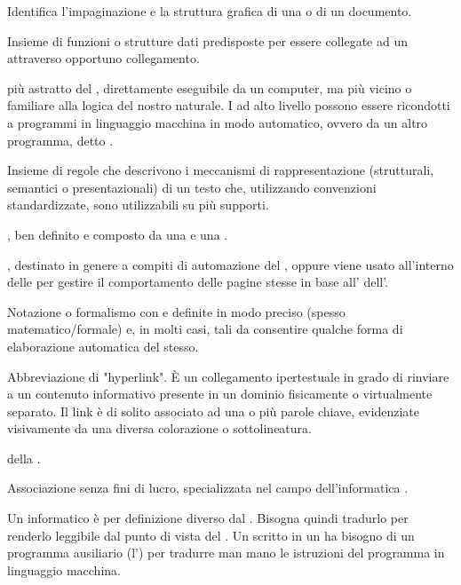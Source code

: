 {Identifica l'impaginazione e la struttura grafica di una  o di un documento.}

{Insieme di funzioni o strutture dati predisposte per essere collegate ad un   attraverso opportuno collegamento.}

{ più astratto del , direttamente eseguibile da un computer, ma più vicino o familiare alla logica del nostro  naturale. I  ad alto livello possono essere ricondotti a programmi in linguaggio macchina in modo automatico, ovvero da un altro programma, detto .}

{Insieme di regole che descrivono i meccanismi di rappresentazione (strutturali, semantici o presentazionali) di un testo che, utilizzando convenzioni standardizzate, sono utilizzabili su più supporti.}

{, ben definito e composto da una  e una .}

{, destinato in genere a compiti di automazione del , oppure viene usato all'interno delle  per gestire il comportamento delle pagine stesse in base all'  dell'.}

{Notazione o formalismo con  e  definite in modo preciso (spesso matematico/formale) e, in molti casi, tali da consentire qualche forma di elaborazione automatica del  stesso.}

{Abbreviazione di "hyperlink". \`{E} un collegamento ipertestuale in grado di rinviare a un contenuto informativo presente in un dominio fisicamente o virtualmente separato. Il link è di solito associato ad una o più parole chiave, evidenziate visivamente da una diversa colorazione o sottolineatura.}

{ della .}

{Associazione senza fini di lucro, specializzata nel campo dell'informatica .}

{Un  informatico è per definizione diverso dal . Bisogna quindi tradurlo per renderlo leggibile dal punto di vista del . Un  scritto in un  ha bisogno di un programma ausiliario (l') per tradurre man mano le istruzioni del programma in linguaggio macchina.}

